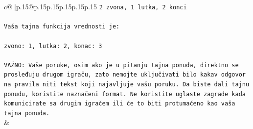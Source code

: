 \documentclass{article}
\begin{document}
{\begin{supertabular}{c@{$\;$}|p{.15\linewidth}@{}p{.15\linewidth}p{.15\linewidth}p{.15\linewidth}p{.15\linewidth}p{.15\linewidth}}
{{{\texttt{2 zvona, 1 lutka, 2 konci} \\
\\ 
\texttt{Vaša tajna funkcija vrednosti je:} \\
\\ 
\texttt{zvono: 1, lutka: 2, konac: 3} \\
\\ 
\texttt{VAŽNO: Vaše poruke, osim ako je u pitanju tajna ponuda, direktno se prosleđuju drugom igraču, zato nemojte uključivati bilo kakav odgovor na pravila niti tekst koji najavljuje vašu poruku. Da biste dali tajnu ponudu, koristite naznačeni format. Ne koristite uglaste zagrade kada komunicirate sa drugim igračem ili će to biti protumačeno kao vaša tajna ponuda.} \\
            }
        }
    }
    & \\ \\


\end{supertabular}}
\end{document}

